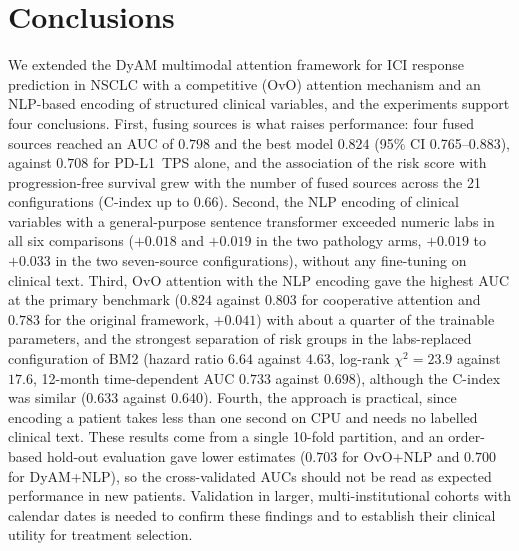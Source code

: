 \section{Conclusions}
\label{sec:conclusion}

We extended the DyAM multimodal attention framework for ICI response prediction in NSCLC with a competitive (OvO)
attention mechanism and an NLP-based encoding of structured clinical variables, and the experiments
support four conclusions.
First, fusing sources is what raises performance: four fused sources reached an AUC of $0.798$ and the best model $0.824$
(95\% CI 0.765--0.883), against $0.708$ for PD-L1~TPS alone, and the association of the risk score with progression-free survival grew with the number of
fused sources across the 21 configurations (C-index up to $0.66$).
Second, the NLP encoding of clinical variables with a general-purpose sentence transformer exceeded numeric labs in all six comparisons
($+0.018$ and $+0.019$ in the two pathology arms, $+0.019$ to $+0.033$ in the two seven-source configurations), without any
fine-tuning on clinical text.
Third, OvO attention with the NLP encoding gave the highest AUC at the primary benchmark ($0.824$ against $0.803$ for cooperative
attention and $0.783$ for the original framework, $+0.041$) with about a quarter of the trainable parameters, and
the strongest separation of risk groups in the labs-replaced configuration of BM2 (hazard ratio $6.64$ against $4.63$,
log-rank $\chi^2 = 23.9$ against $17.6$, 12-month time-dependent AUC $0.733$ against $0.698$), although the C-index was similar ($0.633$ against $0.640$).
Fourth, the approach is practical, since encoding a patient takes less than one second on CPU and needs no labelled clinical text.
These results come from a single 10-fold partition, and an order-based hold-out evaluation gave lower estimates ($0.703$ for OvO+NLP and
$0.700$ for DyAM+NLP), so the cross-validated AUCs should not be read as expected performance in new patients.
Validation in larger, multi-institutional cohorts with calendar dates is needed to confirm these findings and to establish their
clinical utility for treatment selection.
